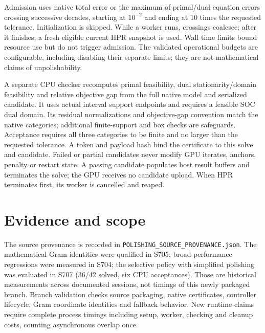 \documentclass[11pt]{article}
\begin{document}
Admission uses native total error or the maximum of primal/dual equation errors
crossing successive decades, starting at $10^{-2}$ and ending at $10$ times
the requested tolerance. Initialization is skipped. While a worker runs,
crossings coalesce; after it finishes, a fresh eligible current HPR snapshot is
used. Wall time limits bound resource use but do not trigger admission. The
validated operational budgets are configurable, including disabling their
separate limits; they are not mathematical claims of unpolishability.

A separate CPU checker recomputes primal feasibility, dual stationarity/domain
feasibility and relative objective gap from the full native model and serialized
candidate. It uses actual interval support endpoints and requires a feasible
SOC dual domain. Its residual normalizations and objective-gap convention match
the native categories; additional finite-support and box checks are safeguards.
Acceptance requires all three categories to be finite and no larger than the
requested tolerance. A token and payload hash bind the certificate to this
solve and candidate. Failed or partial candidates never modify GPU iterates,
anchors, penalty or restart state. A passing candidate populates host result
buffers and terminates the solve; the GPU receives no candidate upload.
When HPR terminates first, its worker is cancelled and reaped.

\section{Evidence and scope}
The source provenance is recorded in \texttt{POLISHING\_SOURCE\_PROVENANCE.json}.
The mathematical Gram identities were qualified in S705; broad performance
regressions were measured in S704; the selective policy with simplified
polishing was evaluated in S707 (36/42 solved, six CPU acceptances). Those are
historical measurements across documented sessions, not timings of this newly
packaged branch. Branch validation checks source packaging, native certificates,
controller lifecycle, Gram coordinate identities and fallback behavior.
New runtime claims require complete process timings including setup, worker,
checking and cleanup costs, counting asynchronous overlap once.
\end{document}
